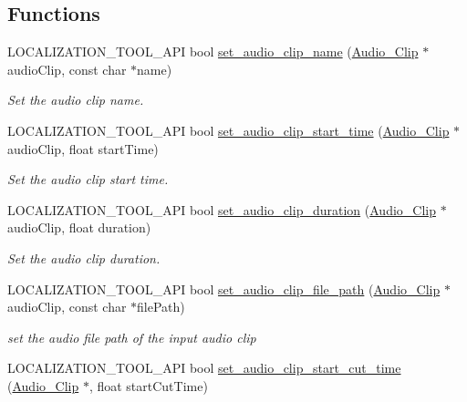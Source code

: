 \subsection*{Functions}
\begin{DoxyCompactItemize}
\item 
L\+O\+C\+A\+L\+I\+Z\+A\+T\+I\+O\+N\+\_\+\+T\+O\+O\+L\+\_\+\+A\+PI bool \mbox{\hyperlink{namespaceprz_abbc097e730e2a3eb42a2f205fd714bf2}{set\+\_\+audio\+\_\+clip\+\_\+name}} (\mbox{\hyperlink{classprz_1_1_audio___clip}{Audio\+\_\+\+Clip}} $\ast$audio\+Clip, const char $\ast$name)
\begin{DoxyCompactList}\small\item\em Set the audio clip name. \end{DoxyCompactList}\item 
L\+O\+C\+A\+L\+I\+Z\+A\+T\+I\+O\+N\+\_\+\+T\+O\+O\+L\+\_\+\+A\+PI bool \mbox{\hyperlink{namespaceprz_ac8b09f14a5b58fe5ca2521460856443d}{set\+\_\+audio\+\_\+clip\+\_\+start\+\_\+time}} (\mbox{\hyperlink{classprz_1_1_audio___clip}{Audio\+\_\+\+Clip}} $\ast$audio\+Clip, float start\+Time)
\begin{DoxyCompactList}\small\item\em Set the audio clip start time. \end{DoxyCompactList}\item 
L\+O\+C\+A\+L\+I\+Z\+A\+T\+I\+O\+N\+\_\+\+T\+O\+O\+L\+\_\+\+A\+PI bool \mbox{\hyperlink{namespaceprz_a6f3d46bb8898e0ab0f8200ff01e68b83}{set\+\_\+audio\+\_\+clip\+\_\+duration}} (\mbox{\hyperlink{classprz_1_1_audio___clip}{Audio\+\_\+\+Clip}} $\ast$audio\+Clip, float duration)
\begin{DoxyCompactList}\small\item\em Set the audio clip duration. \end{DoxyCompactList}\item 
L\+O\+C\+A\+L\+I\+Z\+A\+T\+I\+O\+N\+\_\+\+T\+O\+O\+L\+\_\+\+A\+PI bool \mbox{\hyperlink{namespaceprz_ade1afd9da96172eda2c255f074e82608}{set\+\_\+audio\+\_\+clip\+\_\+file\+\_\+path}} (\mbox{\hyperlink{classprz_1_1_audio___clip}{Audio\+\_\+\+Clip}} $\ast$audio\+Clip, const char $\ast$file\+Path)
\begin{DoxyCompactList}\small\item\em set the audio file path of the input audio clip \end{DoxyCompactList}\item 
L\+O\+C\+A\+L\+I\+Z\+A\+T\+I\+O\+N\+\_\+\+T\+O\+O\+L\+\_\+\+A\+PI bool \mbox{\hyperlink{namespaceprz_a8ed2ed05812cc89ec640c5fe96182e94}{set\+\_\+audio\+\_\+clip\+\_\+start\+\_\+cut\+\_\+time}} (\mbox{\hyperlink{classprz_1_1_audio___clip}{Audio\+\_\+\+Clip}} $\ast$, float start\+Cut\+Time)

\end{DoxyCompactItemize}
